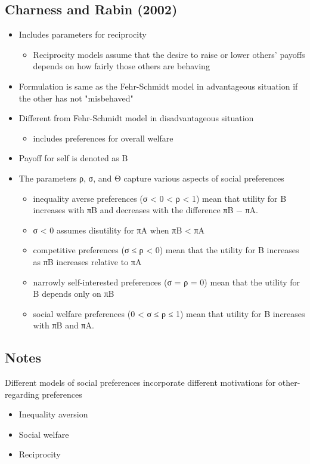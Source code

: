 \subsection{Charness and Rabin (2002)}
\begin{itemize}
    \item Includes parameters for reciprocity
    \begin{itemize}
        \item Reciprocity models assume that the desire to raise or lower others' payoffs depends on how fairly those others are behaving
    \end{itemize}
    \item Formulation is same as the Fehr-Schmidt model in advantageous situation if the other has not "misbehaved"
    \item Different from Fehr-Schmidt model in disadvantageous situation
    \begin{itemize}
        \item includes preferences for overall welfare
    \end{itemize}
    \item Payoff for self is denoted as B
  \item  The parameters ρ, σ, and Θ capture various aspects of social preferences
\begin{itemize}
    \item inequality averse preferences (σ < 0 < ρ < 1) mean that utility for B increases with πB and
decreases with the difference πB − πA.
\item σ < 0 assumes disutility for πA when πB < πA
\item competitive preferences (σ ≤ ρ < 0) mean that the utility for B increases as πB increases
relative to πA
\item narrowly self-interested preferences (σ = ρ = 0) mean that the utility for B depends only on
πB
\item social welfare preferences (0 < σ ≤ ρ ≤ 1) mean that utility for B increases with πB and πA.
\end{itemize} 
\end{itemize}

\subsection{Notes}
Different models of social preferences incorporate different motivations for other-regarding preferences
\begin{itemize}
    \item Inequality aversion
    \item Social welfare
    \item Reciprocity
\end{itemize}
